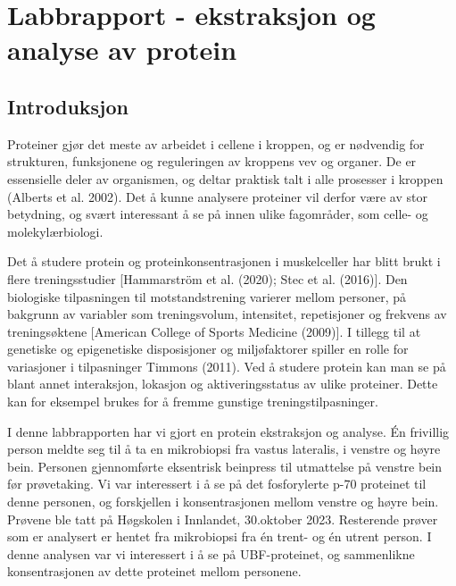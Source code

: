\documentclass[
  letterpaper,
  DIV=11,
  numbers=noendperiod]{scrreprt}
\begin{document}

\hypertarget{labbrapport---ekstraksjon-og-analyse-av-protein}{%
\chapter{Labbrapport - ekstraksjon og analyse av
protein}\label{labbrapport---ekstraksjon-og-analyse-av-protein}}

\hypertarget{introduksjon}{%
\section{\texorpdfstring{\textbf{Introduksjon}}{Introduksjon}}\label{introduksjon}}

Proteiner gjør det meste av arbeidet i cellene i kroppen, og er
nødvendig for strukturen, funksjonene og reguleringen av kroppens vev og
organer. De er essensielle deler av organismen, og deltar praktisk talt
i alle prosesser i kroppen (Alberts et al. 2002). Det å kunne analysere
proteiner vil derfor være av stor betydning, og svært interessant å se
på innen ulike fagområder, som celle- og molekylærbiologi.

Det å studere protein og proteinkonsentrasjonen i muskelceller har blitt
brukt i flere treningsstudier {[}Hammarström et al. (2020); Stec et al.
(2016){]}. Den biologiske tilpasningen til motstandstrening varierer
mellom personer, på bakgrunn av variabler som treningsvolum, intensitet,
repetisjoner og frekvens av treningsøktene {[}American College of Sports
Medicine (2009){]}. I tillegg til at genetiske og epigenetiske
disposisjoner og miljøfaktorer spiller en rolle for variasjoner i
tilpasninger Timmons (2011). Ved å studere protein kan man se på blant
annet interaksjon, lokasjon og aktiveringsstatus av ulike proteiner.
Dette kan for eksempel brukes for å fremme gunstige
treningstilpasninger.

I denne labbrapporten har vi gjort en protein ekstraksjon og analyse. Én
frivillig person meldte seg til å ta en mikrobiopsi fra vastus
lateralis, i venstre og høyre bein. Personen gjennomførte eksentrisk
beinpress til utmattelse på venstre bein før prøvetaking. Vi var
interessert i å se på det fosforylerte p-70 proteinet til denne
personen, og forskjellen i konsentrasjonen mellom venstre og høyre bein.
Prøvene ble tatt på Høgskolen i Innlandet, 30.oktober 2023. Resterende
prøver som er analysert er hentet fra mikrobiopsi fra én trent- og én
utrent person. I denne analysen var vi interessert i å se på
UBF-proteinet, og sammenlikne konsentrasjonen av dette proteinet mellom
personene.
\end{document}
